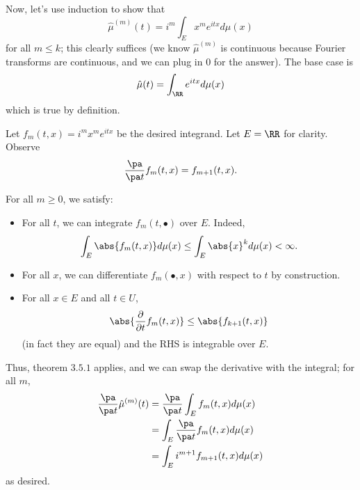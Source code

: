 \documentclass[11pt, headheight=30pt]{scrartcl}
\begin{document}

Now, let's use induction to show that
\[
    \hat{\mu}^{(m)}(t) = i^m \int_E x^m e^{itx} d\mu(x)\tag{$\star$}
\]
for all $m \leq k$; this clearly suffices (we know $\hat{\mu}^{(m)}$
is continuous because Fourier transforms are continuous, and we can
plug in $0$ for the answer).
The base case is
\[
    \hat{\mu}(t) = \int_{\RR} e^{itx} d\mu(x)    
\]
which is true by definition.

Let $f_m(t,x) = i^m x^me^{itx}$ be the desired integrand. Let $E = \RR$ for clarity.
Observe
\[
    \frac{\pa}{\pa t} f_m(t,x) = f_{m+1}(t,x).
\]

For all $m\geq 0$, we satisfy:
\begin{itemize}
    \item For all $t$, we can integrate $f_m(t,\bullet)$ over $E$. Indeed,
    \[
        \int_E \abs{f_m(t,x)} d\mu(x) \leq \int_E \abs{x}^k d\mu(x) < \infty.
    \]
    \item For all $x$, we can differentiate $f_m(\bullet,x)$ with respect
    to $t$ by construction.
    \item For all $x\in E$ and all $t\in U$,
    \[
        \abs{ \frac{\partial}{\partial t} f_m(t,x) } \leq \abs{f_{k+1}(t,x)}    
    \]
    (in fact they are equal) and the RHS is integrable over $E$.
\end{itemize}
Thus, theorem $3.5.1$ applies, and we can swap the derivative with
the integral; for all $m$,
\begin{align*}
    \frac{\pa}{\pa t} \hat{\mu}^{(m)}(t) &= \frac{\pa}{\pa t} \int_E f_m(t,x) d\mu(x) \\
    &= \int_E \frac{\pa}{\pa t} f_m(t,x) d\mu(x) \\
    &= \int_E i^{m+1} f_{m+1}(t,x) d\mu(x)
\end{align*}
as desired.


\end{document}
